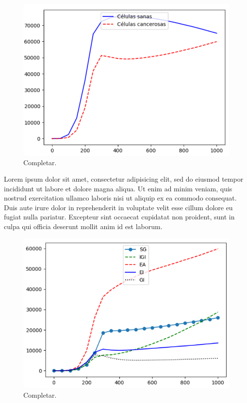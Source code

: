 \begin{figure}[h]
\centering
\includegraphics[scale=0.8]{figures/experiments/exp3/healthvscarcino}
\caption{Completar.}
\end{figure}

Lorem ipsum dolor sit amet, consectetur adipisicing elit, sed do eiusmod tempor incididunt ut labore et dolore magna aliqua.
Ut enim ad minim veniam, quis nostrud exercitation ullamco laboris nisi ut aliquip ex ea commodo consequat.
Duis aute irure dolor in reprehenderit in voluptate velit esse cillum dolore eu fugiat nulla pariatur.
Excepteur sint occaecat cupidatat non proident, sunt in culpa qui officia deserunt mollit anim id est laborum.

\begin{figure}[h]
\centering
\includegraphics[scale=0.8]{figures/experiments/exp3/mutations}
\caption{Completar.}
\end{figure}

